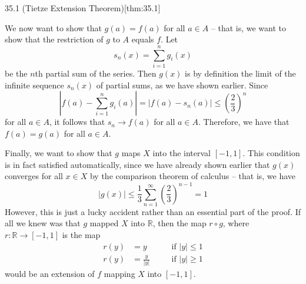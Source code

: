 \begin{thmBox}{35.1 (Tietze Extension Theorem)}[thm:35.1]
\begin{proofBox}
    We now want to show that \( g ( a ) = f ( a ) \) for all \( a \in A \) -- that 
    is, we want to show that the restriction of \( g \) to \( A \) equals \( f \).
    Let 
    \begin{equation*}
        s_{ n } ( x ) = \sum_{ i = 1 }^{ n } g_{ i } ( x )
    \end{equation*}
    be the \( n \)th partial sum of the series. 
    Then \( g ( x ) \) is by definition the limit of the infinite sequence 
    \( s_{ n } ( x ) \) of partial sums, as we have shown earlier. 
    Since 
    \begin{equation*}
        \left\lvert
            f ( a ) - \sum_{ i = 1 }^{ n } g_{ i } ( a )
        \right\rvert
        =
        \lvert f ( a ) - s_{ n } ( a ) \rvert
        \leq 
        \left( \frac{ 2 }{ 3 } \right)^{ n }
    \end{equation*}
    for all \( a \in A \), it follows that \( s_{ n } \rightarrow f ( a ) \) 
    for all \( a \in A \). 
    Therefore, we have that \( f ( a ) = g ( a ) \) for all \( a \in A \). 

    \baseSkip 

    Finally, we want to show that \( g \) maps \( X \) into the interval 
    \( [ -1, 1 ] \). 
    This condition is in fact satisfied automatically, since we have already shown 
    earlier that \( g ( x ) \) converges for all \( x \in X \) by the comparison 
    theorem of calculus -- that is, we have 
    \begin{equation*}
        \lvert g ( x ) \rvert 
        \leq 
        \frac{ 1 }{ 3 } \sum_{ n = 1 }^{ \infty } 
        \left( \frac{ 2 }{ 3 } \right)^{ n - 1 }
        =
        1
    \end{equation*}
    However, this is just a lucky accident rather than an essential part of the 
    proof. 
    If all we knew was that \( g \) mapped \( X \) into \( \mathbb{R} \), then 
    the map \( r \circ g \), where \( r: \mathbb{R} \rightarrow [ -1, 1 ] \) is the 
    map 
    \begin{equation*}
        \begin{alignedat}{2}
            r ( y ) &= y &&\quad \text{if } \lvert y \rvert \leq 1 
            \\
            r ( y ) &= \frac{ y }{ \lvert y \rvert } 
            &&\quad \text{if } \lvert y \rvert \geq 1 
        \end{alignedat}
    \end{equation*}
    would be an extension of \( f \) mapping \( X \) into \( [ -1, 1 ] \). 


\end{proofBox}
\end{thmBox}
